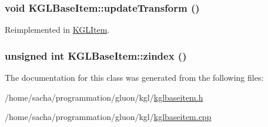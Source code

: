 \hypertarget{class_k_g_l_base_item_6e020830d4452864cdb6c8fea4531e0d}{
\subsubsection[{updateTransform}]{\setlength{\rightskip}{0pt plus 5cm}void KGLBaseItem::updateTransform ()}}
\label{class_k_g_l_base_item_6e020830d4452864cdb6c8fea4531e0d}




Reimplemented in \hyperlink{class_k_g_l_item_3dbecc9db8e526a4c9623b35a004ed3c}{KGLItem}.\hypertarget{class_k_g_l_base_item_22da0f3dbc3522a836980df6f8e96def}{
\subsubsection[{zindex}]{\setlength{\rightskip}{0pt plus 5cm}unsigned int KGLBaseItem::zindex ()}}
\label{class_k_g_l_base_item_22da0f3dbc3522a836980df6f8e96def}




The documentation for this class was generated from the following files:\begin{CompactItemize}
\item 
/home/sacha/programmation/gluon/kgl/\hyperlink{kglbaseitem_8h}{kglbaseitem.h}\item 
/home/sacha/programmation/gluon/kgl/\hyperlink{kglbaseitem_8cpp}{kglbaseitem.cpp}\end{CompactItemize}
